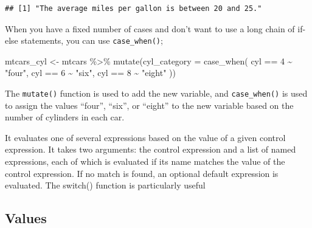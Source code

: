 \documentclass[
  12pt,
  oneside]{book}
\newenvironment{Shaded}{\begin{snugshade}}{\end{snugshade}}
\newcommand{\AttributeTok}[1]{\textcolor[rgb]{0.77,0.63,0.00}{#1}}
\newcommand{\CommentTok}[1]{\textcolor[rgb]{0.56,0.35,0.01}{\textit{#1}}}
\newcommand{\DecValTok}[1]{\textcolor[rgb]{0.00,0.00,0.81}{#1}}
\newcommand{\FunctionTok}[1]{\textcolor[rgb]{0.00,0.00,0.00}{#1}}
\newcommand{\NormalTok}[1]{#1}
\newcommand{\OtherTok}[1]{\textcolor[rgb]{0.56,0.35,0.01}{#1}}
\newcommand{\SpecialCharTok}[1]{\textcolor[rgb]{0.00,0.00,0.00}{#1}}
\newcommand{\StringTok}[1]{\textcolor[rgb]{0.31,0.60,0.02}{#1}}
\theoremstyle{definition}
\theoremstyle{definition}
\theoremstyle{definition}
\theoremstyle{definition}
\theoremstyle{remark}
\begin{document}
\begin{verbatim}
## [1] "The average miles per gallon is between 20 and 25."
\end{verbatim}

\begin{Shaded}
\end{Shaded}

When you have a fixed number of cases and don't want to use a long chain of if-else statements, you can use \texttt{case\_when()};

\begin{Shaded}
\begin{Highlighting}[]
\NormalTok{mtcars\_cyl }\OtherTok{\textless{}{-}}\NormalTok{ mtcars }\SpecialCharTok{\%\textgreater{}\%}
  \FunctionTok{mutate}\NormalTok{(}\AttributeTok{cyl\_category =} \FunctionTok{case\_when}\NormalTok{(}
\NormalTok{    cyl }\SpecialCharTok{==} \DecValTok{4} \SpecialCharTok{\textasciitilde{}} \StringTok{"four"}\NormalTok{,}
\NormalTok{    cyl }\SpecialCharTok{==} \DecValTok{6} \SpecialCharTok{\textasciitilde{}} \StringTok{"six"}\NormalTok{,}
\NormalTok{    cyl }\SpecialCharTok{==} \DecValTok{8} \SpecialCharTok{\textasciitilde{}} \StringTok{"eight"}
\NormalTok{  ))}
\end{Highlighting}
\end{Shaded}

The \texttt{mutate()} function is used to add the new variable, and \texttt{case\_when()} is used to assign the values ``four'', ``six'', or ``eight'' to the new variable based on the number of cylinders in each car.

It evaluates one of several expressions based on the value of a given control expression. It takes two arguments: the control expression and a list of named expressions, each of which is evaluated if its name matches the value of the control expression. If no match is found, an optional default expression is evaluated. The switch() function is particularly useful

\hypertarget{values}{%
\subsection{Values}\label{values}}
\end{document}
